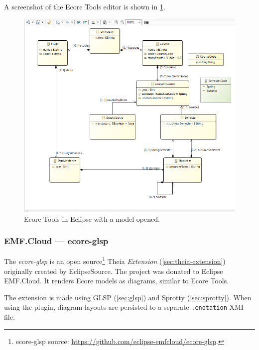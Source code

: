 A screenshot of the Ecore Tools editor is shown in \cref{fig:ecore-tools-screenshot}.

\begin{figure}[htbp]  %
  \centering
  \includegraphics[width=\textwidth]{figures/ecore-eclipse-sirius-aird-graphical-editor.png}
  \caption[Ecore Tools Screenshot]{Ecore Tools in \gls{Eclipse} with a model opened.}\label{fig:ecore-tools-screenshot}
\end{figure}


\subsubsection{EMF.Cloud --- ecore-glsp} %
The \emph{ecore-glsp} is an \gls{open source}\footnote{ecore-glsp source: \href{https://github.com/eclipse-emfcloud/ecore-glsp}{https://github.com/eclipse-emfcloud/ecore-glsp}.} \gls{Theia} \emph{Extension} (\cref{sec:theia-extension}) originally created by EclipseSource.
The project was donated to Eclipse EMF.Cloud.
It renders \gls{Ecore} models as diagrams, similar to Ecore Tools.

The extension is made using \gls{GLSP} (\cref{sec:glsp}) and Sprotty (\cref{sec:sprotty}).
When using the plugin, diagram layouts are persisted to a separate \texttt{.enotation} \gls{XMI} file.~\cite{camilleletavernierEclipseemfcloudEcoreglsp2020}

